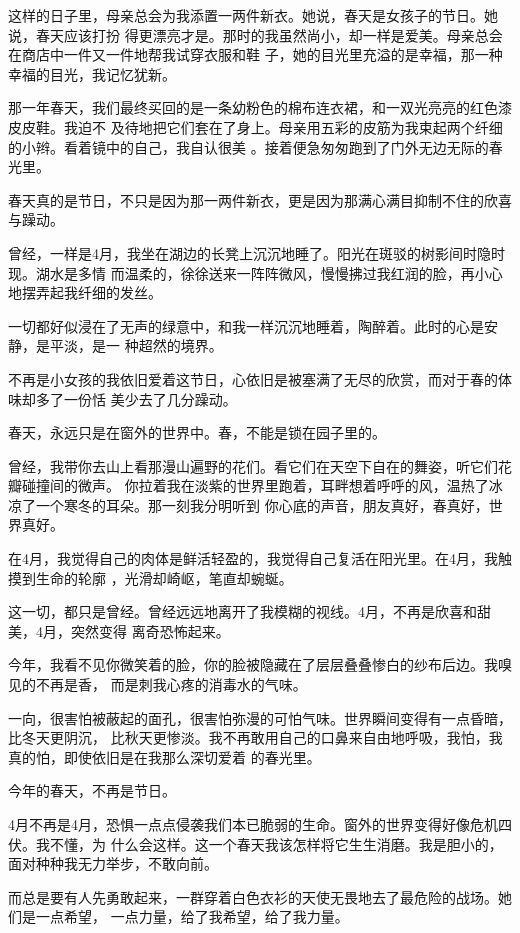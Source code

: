 \documentclass[12pt,a4paper]{article}
\begin{document}
		这样的日子里，母亲总会为我添置一两件新衣。她说，春天是女孩子的节日。她说，春天应该打扮
	得更漂亮才是。那时的我虽然尚小，却一样是爱美。母亲总会在商店中一件又一件地帮我试穿衣服和鞋
	子，她的目光里充溢的是幸福，那一种幸福的目光，我记忆犹新。

		那一年春天，我们最终买回的是一条幼粉色的棉布连衣裙，和一双光亮亮的红色漆皮皮鞋。我迫不
	及待地把它们套在了身上。母亲用五彩的皮筋为我束起两个纤细的小辫。看着镜中的自己，我自认很美
	。接着便急匆匆跑到了门外无边无际的春光里。

		春天真的是节日，不只是因为那一两件新衣，更是因为那满心满目抑制不住的欣喜与躁动。

		曾经，一样是4月，我坐在湖边的长凳上沉沉地睡了。阳光在斑驳的树影间时隐时现。湖水是多情
	而温柔的，徐徐送来一阵阵微风，慢慢拂过我红润的脸，再小心地摆弄起我纤细的发丝。

		一切都好似浸在了无声的绿意中，和我一样沉沉地睡着，陶醉着。此时的心是安静，是平淡，是一
	种超然的境界。

		不再是小女孩的我依旧爱着这节日，心依旧是被塞满了无尽的欣赏，而对于春的体味却多了一份恬
	美少去了几分躁动。

		春天，永远只是在窗外的世界中。春，不能是锁在园子里的。

		曾经，我带你去山上看那漫山遍野的花们。看它们在天空下自在的舞姿，听它们花瓣碰撞间的微声。
	你拉着我在淡紫的世界里跑着，耳畔想着呼呼的风，温热了冰凉了一个寒冬的耳朵。那一刻我分明听到
	你心底的声音，朋友真好，春真好，世界真好。

		在4月，我觉得自己的肉体是鲜活轻盈的，我觉得自己复活在阳光里。在4月，我触摸到生命的轮廓
	，光滑却崎岖，笔直却蜿蜒。

		这一切，都只是曾经。曾经远远地离开了我模糊的视线。4月，不再是欣喜和甜美，4月，突然变得
	离奇恐怖起来。

		今年，我看不见你微笑着的脸，你的脸被隐藏在了层层叠叠惨白的纱布后边。我嗅见的不再是香，
	而是刺我心疼的消毒水的气味。

		一向，很害怕被蔽起的面孔，很害怕弥漫的可怕气味。世界瞬间变得有一点昏暗，比冬天更阴沉，
	比秋天更惨淡。我不再敢用自己的口鼻来自由地呼吸，我怕，我真的怕，即使依旧是在我那么深切爱着
	的春光里。

		今年的春天，不再是节日。

		4月不再是4月，恐惧一点点侵袭我们本已脆弱的生命。窗外的世界变得好像危机四伏。我不懂，为
	什么会这样。这一个春天我该怎样将它生生消磨。我是胆小的，面对种种我无力举步，不敢向前。

		而总是要有人先勇敢起来，一群穿着白色衣衫的天使无畏地去了最危险的战场。她们是一点希望，
	一点力量，给了我希望，给了我力量。
\end{document}
